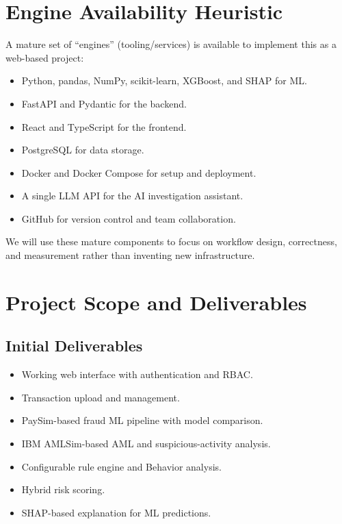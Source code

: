 \documentclass[11pt,a4paper]{article}
\begin{document}
\section{Engine Availability Heuristic}
A mature set of ``engines'' (tooling/services) is available to implement this as a web-based project:
\begin{itemize}[leftmargin=0.7cm]
    \item Python, pandas, NumPy, scikit-learn, XGBoost, and SHAP for ML.
    \item FastAPI and Pydantic for the backend.
    \item React and TypeScript for the frontend.
    \item PostgreSQL for data storage.
    \item Docker and Docker Compose for setup and deployment.
    \item A single LLM API for the AI investigation assistant.
    \item GitHub for version control and team collaboration.
\end{itemize}
We will use these mature components to focus on workflow design, correctness, and measurement rather than inventing new infrastructure.

\section{Project Scope and Deliverables}
\subsection{Initial Deliverables }
\begin{itemize}[leftmargin=0.7cm]
    \item Working web interface with authentication and RBAC.
    \item Transaction upload and management.
    \item PaySim-based fraud ML pipeline with model comparison.
    \item IBM AMLSim-based AML and suspicious-activity analysis.
    \item Configurable rule engine and Behavior analysis.
    \item Hybrid risk scoring.
    \item SHAP-based explanation for ML predictions.
\end{itemize}
\end{document}
